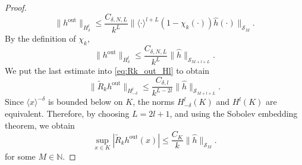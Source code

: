 \documentclass[12pt,a4paper]{amsart}
\numberwithin{equation}{section}
\theoremstyle{plain}
\theoremstyle{definition}
\begin{document}
\begin{proof}
\begin{equation*}
    \|h^{\mathrm{out}}\|_{H^l_\delta} \leq \frac{C_{\delta,N,L}}{k^L} \|\langle\cdot\rangle^{l+L} (1-\chi_k(\cdot))\widehat{h}(\cdot)\|_{\mathscr{S}_M}.
\end{equation*}
By the definition of $\chi_k$,
\begin{equation*}
    \|h^{\mathrm{out}}\|_{H^l_\delta} \leq \frac{C_{\delta,N,L}}{k^L} \|\widehat{h}\|_{\mathscr{S}_{M + l + L}}.
\end{equation*}
We put the last estimate into \eqref{eq:Rk_out_Hl} to obtain 
\begin{equation}\label{eq:Rh_leq_hath}
    \|\widetilde{R}_k h^{\mathrm{out}}\|_{H^l_{-\delta}} \leq \frac{C_{\delta,l}}{k^{L-2l}} \|\widehat{h}\|_{\mathscr{S}_{M + l + L}}.
\end{equation}
Since $\langle x\rangle^{-\delta}$ is bounded below on $K$,
the norms $H^l_{-\delta}(K)$ and $H^l(K)$ are equivalent. Therefore, by choosing $L=2l+1$, and using the Sobolev embedding theorem, we obtain
\begin{equation}\label{eq:Rk_out_ptwise}
    \sup_{x\in K} |\widetilde{R}_k h^{\mathrm{out}}(x)| \leq \frac{C_{K}}{k} \|\widehat{h}\|_{\mathscr{S}_{M}}.
\end{equation}
for some $M\in \mathbb{N}$.


\end{proof}
\end{document}
